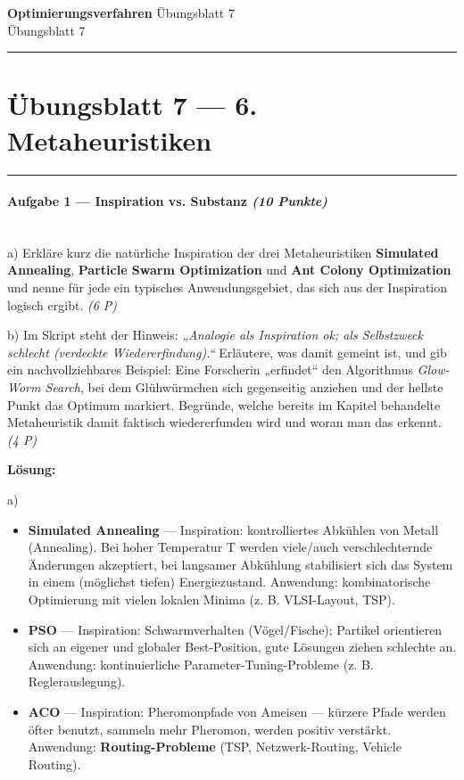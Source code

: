 \documentclass[11pt, a4paper]{article}
\providecommand{\nichttitle}{Übungsblatt}
\providecommand{\nichtsubtitle}{}
\renewcommand{\nichttitle}{Optimierungsverfahren}
\renewcommand{\nichtsubtitle}{Übungsblatt 7}
\begin{document}
\begin{center}
{\Large\bfseries\color{accent}\nichttitle}
\ifx\nichtsubtitle\empty\else
  \\[2pt]{\normalsize\color{accent!80!black}\nichtsubtitle}
\fi
\\[2pt]
\color{accent}\rule{0.4\linewidth}{0.8pt}\color{black}
\end{center}
\vspace{4pt}


\section{Übungsblatt 7 — 6. Metaheuristiken}


\noindent\textcolor{rulegray}{\rule{\linewidth}{0.4pt}}


\paragraph{Aufgabe 1 — Inspiration vs. Substanz \textit{(10 Punkte)}}\mbox{}\\[2pt]

a) Erkläre kurz die natürliche Inspiration der drei Metaheuristiken \textbf{Simulated Annealing}, \textbf{Particle Swarm Optimization} und \textbf{Ant Colony Optimization} und nenne für jede ein typisches Anwendungsgebiet, das sich aus der Inspiration logisch ergibt. \textit{(6 P)}


b) Im Skript steht der Hinweis: \textit{„Analogie als Inspiration ok; als Selbstzweck schlecht (verdeckte Wiedererfindung).“} Erläutere, was damit gemeint ist, und gib ein nachvollziehbares Beispiel: Eine Forscherin „erfindet“ den Algorithmus \textit{Glow-Worm Search}, bei dem Glühwürmchen sich gegenseitig anziehen und der hellste Punkt das Optimum markiert. Begründe, welche bereits im Kapitel behandelte Metaheuristik damit faktisch wiedererfunden wird und woran man das erkennt. \textit{(4 P)}


\textbf{Lösung:}


a)

\begin{itemize}
  \item \textbf{Simulated Annealing} — Inspiration: kontrolliertes Abkühlen von Metall (Annealing). Bei hoher Temperatur T werden viele/auch verschlechternde Änderungen akzeptiert, bei langsamer Abkühlung stabilisiert sich das System in einem (möglichst tiefen) Energiezustand. Anwendung: kombinatorische Optimierung mit vielen lokalen Minima (z. B. VLSI-Layout, TSP).
  \item \textbf{PSO} — Inspiration: Schwarmverhalten (Vögel/Fische); Partikel orientieren sich an eigener und globaler Best-Position, gute Lösungen ziehen schlechte an. Anwendung: kontinuierliche Parameter-Tuning-Probleme (z. B. Reglerauslegung).
  \item \textbf{ACO} — Inspiration: Pheromonpfade von Ameisen — kürzere Pfade werden öfter benutzt, sammeln mehr Pheromon, werden positiv verstärkt. Anwendung: \textbf{Routing-Probleme} (TSP, Netzwerk-Routing, Vehicle Routing).
\end{itemize}
\end{document}
